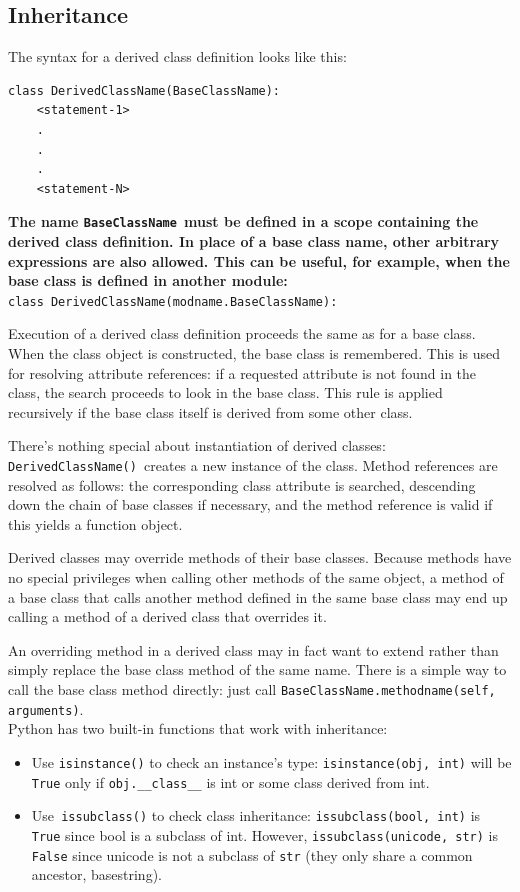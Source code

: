 \documentclass[12pt,a4paper]{article}
\begin{document}
\subsection{Inheritance}
The syntax
for a derived class definition looks like this:
\begin{verbatim}
class DerivedClassName(BaseClassName):
    <statement-1>
    .
    .
    .
    <statement-N>
\end{verbatim}
\textbf{The name \texttt{BaseClassName }must be defined in a scope containing the derived class definition. In place of a base class name, other arbitrary expressions are also allowed. This can be useful, for example, when the base class is defined in another module:}\\
\texttt{class DerivedClassName(modname.BaseClassName):}

Execution of a derived class definition proceeds the same as for a base class. When the class object is constructed, the base class is remembered. This is used for resolving attribute references: if a requested attribute is not found in the class, the search proceeds to look in the base class. This rule is applied recursively if the base class itself is
derived from some other class.

There’s nothing special about instantiation of derived classes: \texttt{DerivedClassName() }creates a new instance of the class. Method references are resolved as follows: the corresponding class attribute is searched, descending down the chain of base classes if necessary, and the method reference is valid if this yields a function object.

Derived classes may override methods of their base classes. Because methods have no special privileges when
calling other methods of the same object, a method of a base class that calls another method defined in the same
base class may end up calling a method of a derived class that overrides it. 

An overriding method in a derived class may in fact want to extend rather than simply replace the base
class method of the same name. There is a simple way to call the base class method directly: just call
\texttt{BaseClassName.methodname(self, arguments)}.
\\
\linebreak
Python has two built-in functions that work with inheritance:
\begin{itemize}
\item Use \texttt{isinstance()} to check an instance’s type: \texttt{isinstance(obj, int)} will be\texttt{ True} only if \texttt{obj.\_\_class\_\_} is int or some class derived from int.
\item Use\texttt{ issubclass()} to check class inheritance: \texttt{issubclass(bool, int)} is \texttt{True} since bool is a subclass of int. However, \texttt{issubclass(unicode, str)} is \texttt{False} since unicode is not a subclass of \texttt{str} (they only share a common ancestor, basestring).
\end{itemize}
\end{document}

